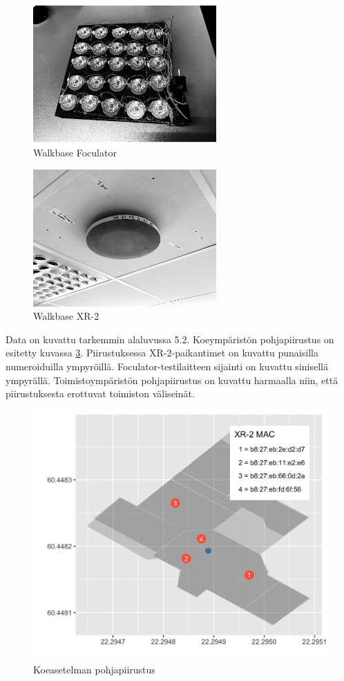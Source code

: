 \documentclass[
  12pt,
  a4paper, twoside]{book}
\begin{document}
\begin{multicols}{2}
\begin{figure}[H]
\centering
\includegraphics[width=7cm]{foculator}
\caption{Walkbase Foculator}
\label{fig:foculator}
\end{figure}

\begin{figure}[H]
\centering
\includegraphics[width=7cm]{xr_2}
\caption{Walkbase XR-2}
\label{fig:xr2}
\end{figure}
\end{multicols}

Data on kuvattu tarkemmin alaluvussa 5.2. Koeympäristön pohjapiirustus on esitetty kuvassa \ref{fig:pohjapiirustus}. Piirustuksessa XR-2-paikantimet on kuvattu punaisilla numeroiduilla ympyröillä. Foculator-testilaitteen sijainti on kuvattu sinisellä ympyrällä. Toimistoympäristön pohjapiirustus on kuvattu harmaalla niin, että piirustuksesta erottuvat toimiston väliseinät.

\begin{figure}[H]
\centering
\includegraphics[width=12cm]{office_map}
\caption{Koeasetelman pohjapiirustus}
\label{fig:pohjapiirustus}
\end{figure}
\end{document}
